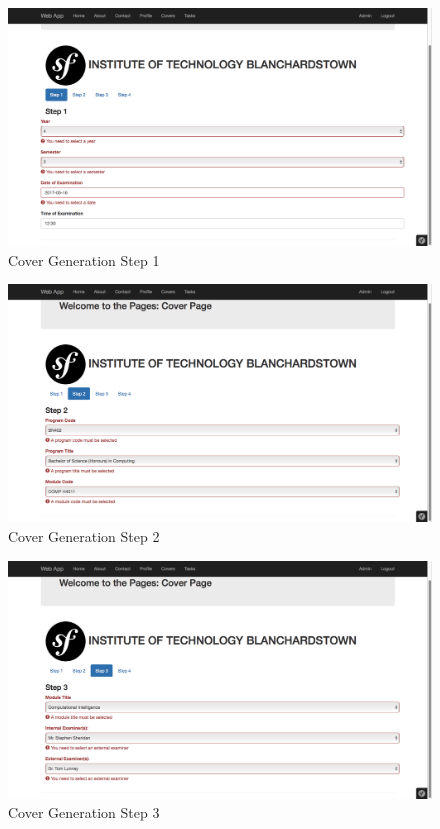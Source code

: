 \begin{figure}[htbp]
   \centering
   \includegraphics[width=400pt]{figures/step_1.png} %
   \caption{Cover Generation Step 1}
   \label{fig:Cover Generation Step 1}
\end{figure}

\begin{figure}[htbp]
   \centering
   \includegraphics[width=400pt]{figures/step_2.png} %
   \caption{Cover Generation Step 2}
   \label{fig:Cover Generation Step 2}
\end{figure}

\begin{figure}[htbp]
   \centering
   \includegraphics[width=400pt]{figures/step_3.png} %
   \caption{Cover Generation Step 3}
   \label{fig:Cover Generation Step 3}
\end{figure}

